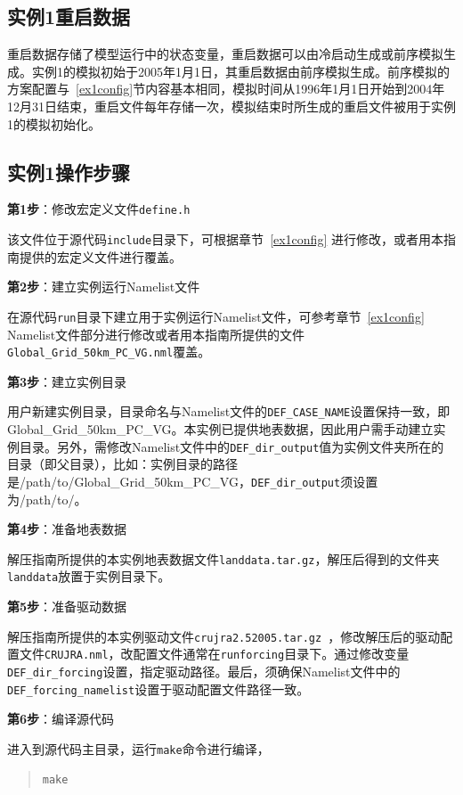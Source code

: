\subsection{实例1重启数据}

重启数据存储了模型运行中的状态变量，重启数据可以由冷启动生成或前序模拟生成。实例1的模拟初始于2005年1月1日，其重启数据由前序模拟生成。前序模拟的方案配置与~\ref{ex1config}节内容基本相同，模拟时间从1996年1月1日开始到2004年12月31日结束，重启文件每年存储一次，模拟结束时所生成的重启文件被用于实例1的模拟初始化。

\subsection{实例1操作步骤}

\textbf{第1步}：修改宏定义文件\texttt{define.h}

该文件位于源代码\texttt{include}目录下，可根据章节~\ref{ex1config} 进行修改，或者用本指南提供的宏定义文件进行覆盖。

\bigskip
\textbf{第2步}：建立实例运行Namelist文件

在源代码\texttt{run}目录下建立用于实例运行Namelist文件，可参考章节~\ref{ex1config} Namelist文件部分进行修改或者用本指南所提供的文件\texttt{Global\_Grid\_50km\_PC\_VG.nml}覆盖。

\bigskip
\textbf{第3步}：建立实例目录

用户新建实例目录，目录命名与Namelist文件的\texttt{DEF\_CASE\_NAME}设置保持一致，即Global\_Grid\_50km\_PC\_VG。本实例已提供地表数据，因此用户需手动建立实例目录。另外，需修改Namelist文件中的\texttt{DEF\_dir\_output}值为实例文件夹所在的目录（即父目录），比如：实例目录的路径是/path/to/Global\_Grid\_50km\_PC\_VG，\texttt{DEF\_dir\_output}须设置为/path/to/。

\bigskip
\textbf{第4步}：准备地表数据

解压指南所提供的本实例地表数据文件\texttt{landdata.tar.gz}，解压后得到的文件夹\texttt{landdata}放置于实例目录下。

\bigskip
\textbf{第5步}：准备驱动数据

解压指南所提供的本实例驱动文件\texttt{crujra2.5\-2005.tar.gz }，修改解压后的驱动配置文件\texttt{CRUJRA.nml}，改配置文件通常在\texttt{run\/forcing}目录下。通过修改变量\texttt{DEF\_dir\_forcing}设置，指定驱动路径。最后，须确保Namelist文件中的\texttt{DEF\_forcing\_namelist}设置于驱动配置文件路径一致。

\bigskip
\textbf{第6步}：编译源代码

进入到源代码主目录，运行\texttt{make}命令进行编译，
\begin{quote}
\begin{lstlisting}
make
\end{lstlisting}
\end{quote}

